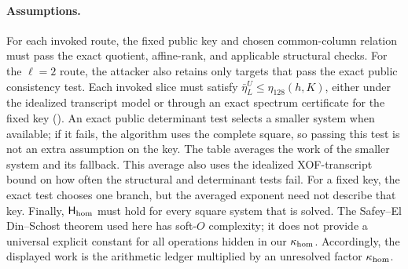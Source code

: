 \documentclass[11pt]{article}
\begin{document}
\paragraph{Assumptions.}
For each invoked route, the fixed public key and chosen common-column relation
must pass the exact quotient, affine-rank, and applicable structural checks.
For the $\ell=2$ route, the attacker also retains only targets that pass the
exact public consistency test.  Each invoked slice must satisfy
$\bar\eta_L^U\le\eta_{128}(h,K)$, either under the idealized transcript model
or through an exact spectrum certificate for the fixed key
().  An exact public determinant test
selects a smaller system when available; if it fails, the algorithm uses the
complete square, so passing this test is not an extra assumption on the key.
The table averages the work of the smaller system and its fallback.  This
average also uses the idealized XOF-transcript bound on how often the
structural and determinant tests fail.  For a fixed key, the exact test
chooses one branch, but the averaged exponent need not describe that key.
Finally, $\mathsf H_{\rm hom}$ must hold for every square system that is
solved.  The Safey--El Din--Schost theorem used here has soft-$O$ complexity;
it does not provide a universal explicit constant for all operations hidden
in our $\kappa_{\rm hom}$.  Accordingly, the displayed work is the arithmetic
ledger multiplied by an unresolved factor $\kappa_{\rm hom}$.
\end{document}
